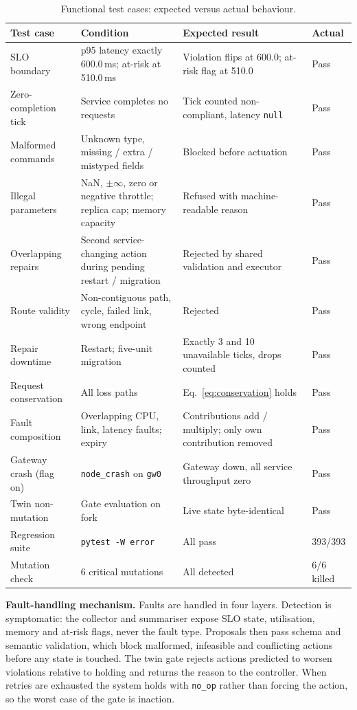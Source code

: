 \documentclass[conference]{IEEEtran}
\begin{document}
\begin{table}[t]
\centering
\caption{Functional test cases: expected versus actual behaviour.}
\label{tab:tests}
\small
\begin{tabularx}{\textwidth}{@{}p{3.3cm}YYp{1.4cm}@{}}
\toprule
Test case & Condition & Expected result & Actual \\
\midrule
SLO boundary & p95 latency exactly 600.0\,ms; at-risk at 510.0\,ms & Violation flips at 600.0; at-risk flag at 510.0 & Pass \\
Zero-completion tick & Service completes no requests & Tick counted non-compliant, latency \texttt{null} & Pass \\
Malformed commands & Unknown type, missing / extra / mistyped fields & Blocked before actuation & Pass \\
Illegal parameters & NaN, $\pm\infty$, zero or negative throttle; replica cap; memory capacity & Refused with machine-readable reason & Pass \\
Overlapping repairs & Second service-changing action during pending restart / migration & Rejected by shared validation and executor & Pass \\
Route validity & Non-contiguous path, cycle, failed link, wrong endpoint & Rejected & Pass \\
Repair downtime & Restart; five-unit migration & Exactly 3 and 10 unavailable ticks, drops counted & Pass \\
Request conservation & All loss paths & Eq.~\eqref{eq:conservation} holds & Pass \\
Fault composition & Overlapping CPU, link, latency faults; expiry & Contributions add / multiply; only own contribution removed & Pass \\
Gateway crash (flag on) & \texttt{node\_crash} on \texttt{gw0} & Gateway down, all service throughput zero & Pass \\
Twin non-mutation & Gate evaluation on fork & Live state byte-identical & Pass \\
Regression suite & \texttt{pytest -W error} & All pass & 393/393 \\
Mutation check & 6 critical mutations & All detected & 6/6 killed \\
\bottomrule
\end{tabularx}
\end{table}

\textbf{Fault-handling mechanism.} Faults are handled in four layers. Detection is symptomatic: the collector and summariser expose SLO state, utilisation, memory and at-risk flags, never the fault type. Proposals then pass schema and semantic validation, which block malformed, infeasible and conflicting actions before any state is touched. The twin gate rejects actions predicted to worsen violations relative to holding and returns the reason to the controller. When retries are exhausted the system holds with \texttt{no\_op} rather than forcing the action, so the worst case of the gate is inaction.
\end{document}
